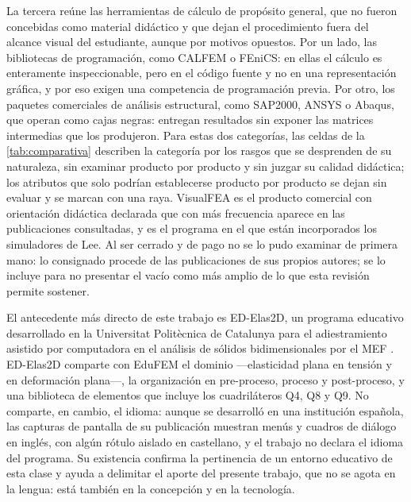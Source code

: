 La tercera reúne las herramientas de cálculo de propósito general, que no fueron concebidas como material didáctico y que dejan el procedimiento fuera del alcance visual del estudiante, aunque por motivos opuestos. Por un lado, las bibliotecas de programación, como CALFEM o FEniCS: en ellas el cálculo es enteramente inspeccionable, pero en el código fuente y no en una representación gráfica, y por eso exigen una competencia de programación previa. Por otro, los paquetes comerciales de análisis estructural, como SAP2000, ANSYS o Abaqus, que operan como cajas negras: entregan resultados sin exponer las matrices intermedias que los produjeron. Para estas dos categorías, las celdas de la \autoref{tab:comparativa} describen la categoría por los rasgos que se desprenden de su naturaleza, sin examinar producto por producto y sin juzgar su calidad didáctica; los atributos que solo podrían establecerse producto por producto se dejan sin evaluar y se marcan con una raya. VisualFEA es el producto comercial con orientación didáctica declarada que con más frecuencia aparece en las publicaciones consultadas, y es el programa en el que están incorporados los simuladores de Lee. Al ser cerrado y de pago no se lo pudo examinar de primera mano: lo consignado procede de las publicaciones de sus propios autores; se lo incluye para no presentar el vacío como más amplio de lo que esta revisión permite sostener.

El antecedente más directo de este trabajo es ED-Elas2D, un programa educativo desarrollado en la Universitat Politècnica de Catalunya para el adiestramiento asistido por computadora en el análisis de sólidos bidimensionales por el MEF \autocite{suarez1998edelas2d}. ED-Elas2D comparte con EduFEM el dominio —elasticidad plana en tensión y en deformación plana—, la organización en pre-proceso, proceso y post-proceso, y una biblioteca de elementos que incluye los cuadriláteros Q4, Q8 y Q9. No comparte, en cambio, el idioma: aunque se desarrolló en una institución española, las capturas de pantalla de su publicación muestran menús y cuadros de diálogo en inglés, con algún rótulo aislado en castellano, y el trabajo no declara el idioma del programa. Su existencia confirma la pertinencia de un entorno educativo de esta clase y ayuda a delimitar el aporte del presente trabajo, que no se agota en la lengua: está también en la concepción y en la tecnología.

